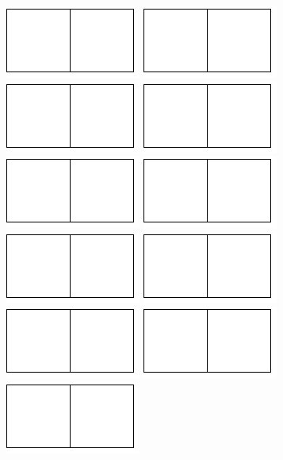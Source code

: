 \documentclass[a4paper]{oblivoir}
\begin{document}
\bigskip\noindent
\includegraphics[width=.2\textwidth]{1}\quad
\includegraphics[width=.2\textwidth]{1}\quad
\includegraphics[width=.2\textwidth]{1}\quad
\includegraphics[width=.2\textwidth]{1}\\[5pt]
\includegraphics[width=.2\textwidth]{1}\quad
\includegraphics[width=.2\textwidth]{1}\quad
\includegraphics[width=.2\textwidth]{1}\quad
\includegraphics[width=.2\textwidth]{1}\\[5pt]
\includegraphics[width=.2\textwidth]{1}\quad
\includegraphics[width=.2\textwidth]{1}\quad
\includegraphics[width=.2\textwidth]{1}\quad
\end{document}
